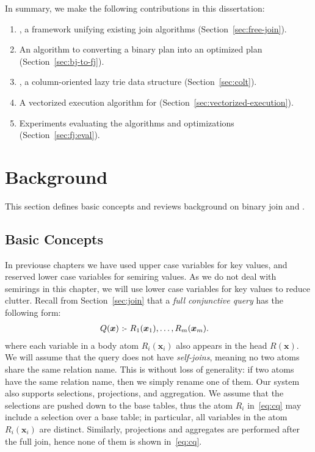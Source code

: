   
In summary, we make the following contributions in this dissertation:
\begin{enumerate}
  \item \FJ, a framework unifying existing join algorithms (Section~\ref{sec:free-join}).
  \item An algorithm to converting a binary plan into an
    optimized \FJ plan (Section~\ref{sec:bj-to-fj}).
  \item \COLT, a column-oriented lazy trie data structure (Section~\ref{sec:colt}).
  \item A vectorized execution algorithm for \FJ (Section~\ref{sec:vectorized-execution}).
  \item Experiments evaluating the algorithms and optimizations (Section~\ref{sec:fj:eval}).
\end{enumerate}

\section{Background}\label{sec:background:fj}

This section defines basic concepts and reviews background on binary
join and \GJ.

\subsection{Basic Concepts}\label{sec:basic-concepts}

In previouse chapters we have used upper case variables for key values, 
 and reserved lower case variables for semiring values. 
As we do not deal with semirings in this chapter, 
 we will use lower case variables for key values to reduce clutter.
Recall from Section~\ref{sec:join} that a \emph{full conjunctive query} 
 has the following form:
%
\begin{align}
  Q(\bm x) \text{ :- } & R_1(\bm x_1), \ldots, R_m(\bm x_m). \label{eq:cq}
\end{align}
%
where each variable in a body atom $R_i({\bm x_i})$ also appears 
 in the head $R({\bm x})$.
We will assume that the query does not have {\em self-joins},
 meaning no two atoms share the same relation name.
This is without loss of generality: if two atoms have the same
relation name, then we simply rename one of them.  
Our system also supports selections, projections, and aggregation.  
We assume that the selections are pushed down to the base tables, thus the atom $R_i$
in~\eqref{eq:cq} may include a selection over a base table; in
particular, all variables in the atom $R_i(\bm x_i)$ are distinct.
Similarly, projections and aggregates are performed after the full
join, hence none of them is shown in~\eqref{eq:cq}.


